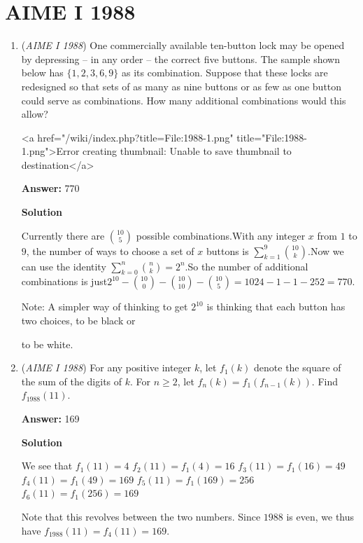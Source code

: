 \section{AIME I 1988}
        \begin{enumerate}
        	\item (\textit{AIME I 1988}) One commercially available ten-button lock may be opened by depressing -- in any order -- the correct five buttons. The sample shown below has $\{1, 2, 3, 6, 9\}$ as its combination. Suppose that these locks are redesigned so that sets of as many as nine buttons or as few as one button could serve as combinations. How many additional combinations would this allow?


 <a href="/wiki/index.php?title=File:1988-1.png" title="File:1988-1.png">Error creating thumbnail: Unable to save thumbnail to destination</a>

 \textbf{Answer: }770



\textbf{Solution}

Currently there are ${10 \choose 5}$ possible combinations.With any integer $x$ from $1$ to $9$, the number of ways to choose a set of $x$ buttons is $\sum^{9}_{k=1}{10 \choose k}$.Now we can use the identity $\sum^{n}_{k=0}{n \choose k}=2^{n}$.So the number of additional combinations is just$2^{10}-{10\choose 0}-{10\choose 10}-{10 \choose 5}=1024-1-1-252=\boxed{770}$.

 
Note: A simpler way of thinking to get $2^{10}$ is thinking that each button has two choices, to be black or

 to be white.

 


	\item (\textit{AIME I 1988}) For any positive integer $k$, let $f_1(k)$ denote the square of the sum of the digits of $k$.  For $n \ge 2$, let $f_n(k) = f_1(f_{n - 1}(k))$.  Find $f_{1988}(11)$.


 
 \textbf{Answer: }169



\textbf{Solution}

We see that $f_{1}(11)=4$
$f_2(11) = f_1(4)=16$
$f_3(11) = f_1(16)=49$
$f_4(11) = f_1(49)=169$
$f_5(11) = f_1(169)=256$
$f_6(11) = f_1(256)=169$

 Note that this revolves between the two numbers. Since $1988$ is even, we thus have $f_{1988}(11) = f_{4}(11) = \boxed{169}$.

 



\end{enumerate}
